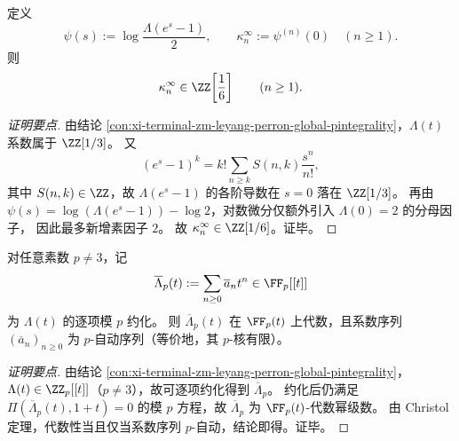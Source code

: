 

\begin{conclusion}\label{con:xi-terminal-zm-leyang-perron-cumulant-denominator-2-3}
定义
\[
\psi(s):=\log\frac{\Lambda(e^s-1)}{2},\qquad
\kappa_n^\infty:=\psi^{(n)}(0)\quad(n\ge 1).
\]
则
\[
\kappa_n^\infty\in\ZZ\!\left[\frac16\right]\qquad(n\ge 1).
\]
\end{conclusion}
\begin{proof}[证明要点]
由结论 \ref{con:xi-terminal-zm-leyang-perron-global-pintegrality}，\(\Lambda(t)\) 系数属于 \(\ZZ[1/3]\)。
又
\[
(e^s-1)^k
=
k!\sum_{n\ge k}S(n,k)\frac{s^n}{n!},
\]
其中 \(S(n,k)\in\ZZ\)，故 \(\Lambda(e^s-1)\) 的各阶导数在 \(s=0\) 落在 \(\ZZ[1/3]\)。
再由 \(\psi(s)=\log(\Lambda(e^s-1))-\log 2\)，对数微分仅额外引入 \(\Lambda(0)=2\) 的分母因子，
因此最多新增素因子 \(2\)。
故 \(\kappa_n^\infty\in\ZZ[1/6]\)。证毕。
\end{proof}

\begin{conclusion}[\texorpdfstring{$p\neq 3$}{p!=3} 下的模 \(p\) 自动性与有限 \(p\)-核]\label{con:xi-terminal-zm-leyang-perron-modp-automaticity}
对任意素数 \(p\neq 3\)，记
\[
\overline{\Lambda}_p(t):=\sum_{n\ge 0}\overline{a}_n t^n\in\FF_p[[t]]
\]
为 \(\Lambda(t)\) 的逐项模 \(p\) 约化。
则 \(\overline{\Lambda}_p(t)\) 在 \(\FF_p(t)\) 上代数，且系数序列 \((\overline{a}_n)_{n\ge 0}\) 为 \(p\)-自动序列（等价地，其 \(p\)-核有限）。
\end{conclusion}
\begin{proof}[证明要点]
由结论 \ref{con:xi-terminal-zm-leyang-perron-global-pintegrality}，\(\Lambda(t)\in\ZZ_p[[t]]\)（\(p\neq 3\)），故可逐项约化得到 \(\overline{\Lambda}_p\)。
约化后仍满足
\(
\Pi(\overline{\Lambda}_p(t),1+t)=0
\)
的模 \(p\) 方程，故 \(\overline{\Lambda}_p\) 为 \(\FF_p(t)\)-代数幂级数。
由 Christol 定理，代数性当且仅当系数序列 \(p\)-自动，结论即得。证毕。
\end{proof}


